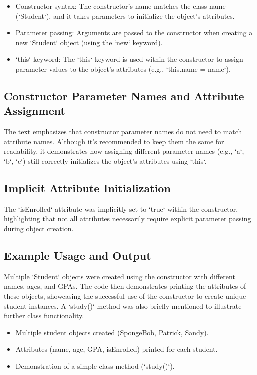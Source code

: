 \documentclass{article}
\begin{document}
\begin{itemize}
    \item Constructor syntax:  The constructor's name matches the class name (`Student`), and it takes parameters to initialize the object's attributes.
    \item Parameter passing:  Arguments are passed to the constructor when creating a new `Student` object (using the `new` keyword).
    \item `this` keyword:  The `this` keyword is used within the constructor to assign parameter values to the object's attributes (e.g., `this.name = name`).
\end{itemize}

\subsection{Constructor Parameter Names and Attribute Assignment}

The text emphasizes that constructor parameter names do not need to match attribute names. Although it's recommended to keep them the same for readability, it demonstrates how assigning different parameter names (e.g., `a`, `b`, `c`) still correctly initializes the object's attributes using `this`.

\subsection{Implicit Attribute Initialization}

The `isEnrolled` attribute was implicitly set to `true` within the constructor, highlighting that not all attributes necessarily require explicit parameter passing during object creation.


\subsection{Example Usage and Output}

Multiple `Student` objects were created using the constructor with different names, ages, and GPAs. The code then demonstrates printing the attributes of these objects, showcasing the successful use of the constructor to create unique student instances.  A `study()` method was also briefly mentioned to illustrate further class functionality.

\begin{itemize}
    \item Multiple student objects created (SpongeBob, Patrick, Sandy).
    \item Attributes (name, age, GPA, isEnrolled) printed for each student.
    \item Demonstration of a simple class method (`study()`).
\end{itemize}
\end{document}
